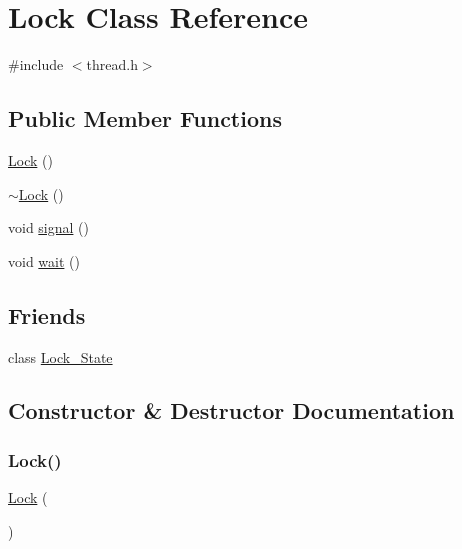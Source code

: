 \hypertarget{classLock}{}\section{Lock Class Reference}
\label{classLock}


{\ttfamily \#include $<$thread.\+h$>$}

\subsection*{Public Member Functions}
\begin{DoxyCompactItemize}
\item 
\mbox{\hyperlink{classLock_a8be1cf6d896d6567f9f287613d6cf934}{Lock}} ()
\item 
\mbox{\hyperlink{classLock_ac83cc649777d71e5d775632548bf4b8a}{$\sim$\+Lock}} ()
\item 
void \mbox{\hyperlink{classLock_a2a0f4bfac2f24aa0a07de86141381aec}{signal}} ()
\item 
void \mbox{\hyperlink{classLock_aa3b21853f890838c88d047d6c2786917}{wait}} ()
\end{DoxyCompactItemize}
\subsection*{Friends}
\begin{DoxyCompactItemize}
\item 
class \mbox{\hyperlink{classLock_aa4cd56dd42d22d72b90cadc832e52591}{Lock\+\_\+\+State}}
\end{DoxyCompactItemize}


\subsection{Constructor \& Destructor Documentation}
\mbox{\label{classLock_a8be1cf6d896d6567f9f287613d6cf934}} 
\subsubsection{\texorpdfstring{Lock()}{Lock()}}
{\footnotesize\ttfamily \mbox{\hyperlink{classLock}{Lock}} (\begin{DoxyParamCaption}{ }\end{DoxyParamCaption})}

\mbox{\label{classLock_ac83cc649777d71e5d775632548bf4b8a}} 
